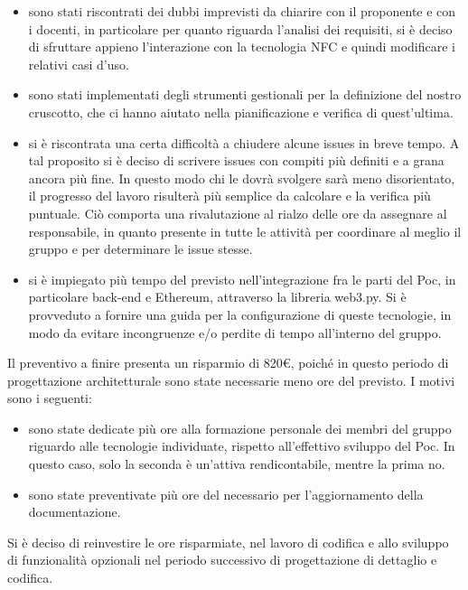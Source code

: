 \begin{itemize}
	\item sono stati riscontrati dei dubbi imprevisti da chiarire con il proponente e con i docenti, in particolare 
per quanto riguarda l'analisi dei requisiti, si è deciso di sfruttare appieno l'interazione con la tecnologia NFC e
quindi modificare i relativi casi d'uso.
\item sono stati implementati degli strumenti gestionali per la definizione del nostro cruscotto, che ci hanno aiutato nella pianificazione 
e verifica di quest'ultima. 
\item si è riscontrata una certa difficoltà a chiudere alcune issues in breve tempo. 
A tal proposito si è deciso di scrivere issues con compiti più definiti e
a grana ancora più fine. In questo modo 
chi le dovrà svolgere sarà meno disorientato, il progresso del lavoro risulterà più semplice da calcolare
e la verifica più puntuale. Ciò comporta una rivalutazione al rialzo delle ore da assegnare al responsabile, in quanto
presente in tutte le attività per coordinare al meglio il gruppo e per determinare le issue stesse.

\item si è impiegato più tempo del previsto nell'integrazione fra le parti del Poc, in particolare back-end e Ethereum, attraverso la libreria web3.py. Si è provveduto a fornire una guida per la configurazione di queste tecnologie, in modo da evitare incongruenze e/o perdite di tempo all'interno del gruppo.
\end{itemize}


Il preventivo a finire presenta un risparmio di 820\euro,
poiché in questo periodo di progettazione architetturale
sono state necessarie meno ore del previsto.
I motivi sono i seguenti:
\begin{itemize}
	\item sono state dedicate più ore alla formazione personale dei membri del gruppo riguardo alle tecnologie individuate,
	rispetto all'effettivo sviluppo del Poc. In questo caso, solo la seconda è un'attiva rendicontabile, mentre la prima no.
	\item sono state preventivate più ore del necessario per l'aggiornamento della documentazione.
\end{itemize}
Si è deciso di reinvestire le ore risparmiate, nel lavoro di codifica
e allo sviluppo di funzionalità opzionali nel periodo successivo di progettazione di dettaglio e codifica.

